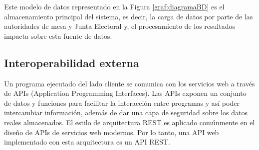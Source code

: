 Este modelo de datos representado en la Figura \ref{graf:diagramaBD} es el almacenamiento principal del sistema, es decir, la carga de datos por parte de las autoridades de mesa y Junta Electoral y, el procesamiento de los resultados impacta sobre esta fuente de datos. 

\subsection{Interoperabilidad externa}
Un programa ejecutado del lado cliente se comunica con los servicios web a través de APIs (Application Programming Interfaces). Las APIs exponen un conjunto de datos y funciones para facilitar la interacción entre programas y así poder intercambiar información, además de dar una capa de seguridad sobre los datos reales almacenados. El estilo de arquitectura REST es aplicado comúnmente en el diseño de APIs de servicios web modernos. Por lo tanto, una API web implementado con esta arquitectura es un API REST. \cite{masse2011rest}

